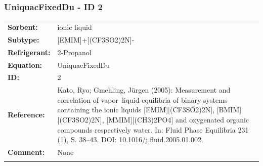 \subsubsection{UniquacFixedDu - ID 2}
%
\begin{tabular}[l]{|lp{11.5cm}|}
\hline
\addlinespace

\textbf{Sorbent:} & ionic liquid \\
\textbf{Subtype:} & [EMIM]+[(CF3SO2)2N]- \\
\textbf{Refrigerant:} & 2-Propanol \\
\textbf{Equation:} & UniquacFixedDu \\
\textbf{ID:} & 2 \\
\textbf{Reference:} & Kato, Ryo; Gmehling, Jürgen (2005): Measurement and correlation of vapor–liquid equilibria of binary systems containing the ionic liquids [EMIM][(CF3SO2)2N], [BMIM][(CF3SO2)2N], [MMIM][(CH3)2PO4] and oxygenated organic compounds respectively water. In: Fluid Phase Equilibria 231 (1), S. 38–43. DOI: 10.1016/j.fluid.2005.01.002. \\
\textbf{Comment:} & None \\

\addlinespace
\hline
\end{tabular}
\newline


